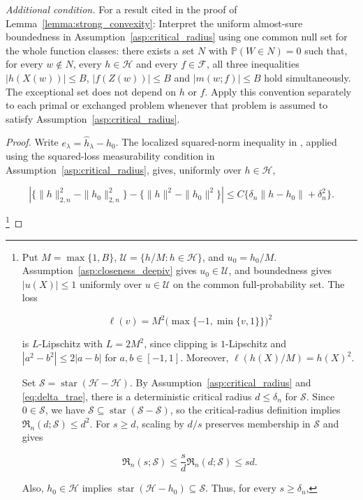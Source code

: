 \emph{Additional condition.} For a result cited in the proof of Lemma~\ref{lemma:strong_convexity}: Interpret the uniform almost-sure boundedness in Assumption~\ref{asp:critical_radius} using one common null set for the whole function classes: there exists a set $N$ with $\mathbb P(W\in N)=0$ such that, for every $w\notin N$, every $h\in\mathcal H$ and every $f\in\mathcal F$, all three inequalities $|h(X(w))|\leqslant B$, $|f(Z(w))|\leqslant B$ and $|m(w;f)|\leqslant B$ hold simultaneously. The exceptional set does not depend on $h$ or $f$. Apply this convention separately to each primal or exchanged problem whenever that problem is assumed to satisfy Assumption~\ref{asp:critical_radius}.
\begin{proof}
Write $e_\lambda=\hat h_\lambda-h_0$. The localized squared-norm inequality in \citet[Lemma~14]{foster2023orthogonal}, applied using the squared-loss measurability condition in Assumption~\ref{asp:critical_radius}, gives, uniformly over $h\in\mathcal H$,

\[
\left|\{\|h\|_{2,n}^2-\|h_0\|_{2,n}^2\}
-\{\|h\|^2-\|h_0\|^2\}\right|
\leqslant C\{\delta_n\|h-h_0\|+\delta_n^2\}.
\]

\footnote{Put $M=\max\{1,B\}$, $\mathcal U=\{h/M:h\in\mathcal H\}$, and $u_0=h_0/M$. Assumption~\ref{asp:closeness_deepiv} gives $u_0\in\mathcal U$, and boundedness gives $|u(X)|\leqslant1$ uniformly over $u\in\mathcal U$ on the common full-probability set. The loss

\[
\ell(v)=M^2\bigl(\max\{-1,\min\{v,1\}\}\bigr)^2
\]

is $L$-Lipschitz with $L=2M^2$, since clipping is $1$-Lipschitz and $|a^2-b^2|\leqslant2|a-b|$ for $a,b\in[-1,1]$. Moreover, $\ell(h(X)/M)=h(X)^2$. 

Set $\mathcal S=\operatorname{star}(\mathcal H-\mathcal H)$. By Assumption~\ref{asp:critical_radius} and \eqref{eq:delta_trae}, there is a deterministic critical radius $d\leqslant\delta_n$ for $\mathcal S$. Since $0\in\mathcal S$, we have $\mathcal S\subseteq\operatorname{star}(\mathcal S-\mathcal S)$, so the critical-radius definition implies $\mathfrak R_n(d;\mathcal S)\leqslant d^2$. For $s\geqslant d$, scaling by $d/s$ preserves membership in $\mathcal S$ and gives

\[
\mathfrak R_n(s;\mathcal S)
\leqslant\frac{s}{d}\mathfrak R_n(d;\mathcal S)
\leqslant sd.
\]

Also, $h_0\in\mathcal H$ implies $\operatorname{star}(\mathcal H-h_0)\subseteq\mathcal S$. Thus, for every $s\geqslant\delta_n$,

}
\end{proof}
